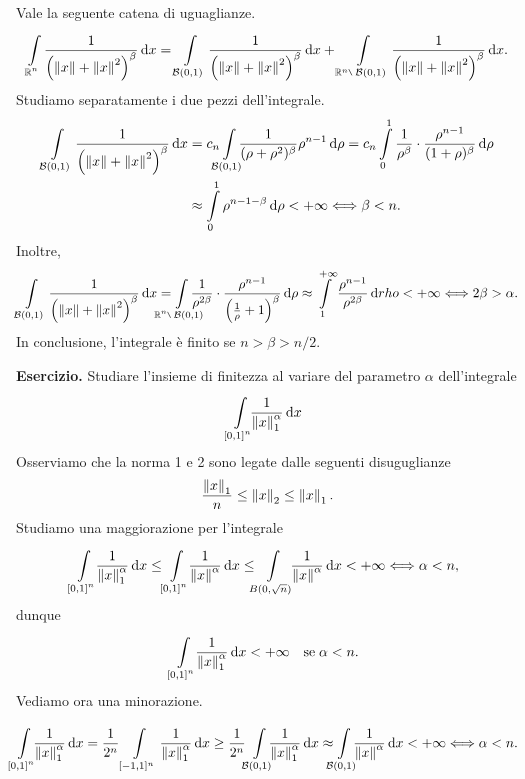 \documentclass[a4paper, 12pt]{report}
\begin{document}
Vale la seguente catena di uguaglianze.
%
$$
\int\limits_{\mathclap{\R^n}}^{} \frac{1}{\left( \norm{ x } + \norm{ x }^2 \right)^\beta} \dd x 
= \int\limits_{\mathcal{B}(0,1)}^{} \frac{1}{\left( \norm{ x } + \norm{ x }^2 \right)^\beta} \dd x 
+ \int\limits_{\R^n \setminus \; \mathcal{B}(0,1)}^{} \frac{1}{\left( \norm{ x } + \norm{ x }^2 \right)^\beta} \dd x.
$$
%
Studiamo separatamente i due pezzi dell'integrale.
%
\begin{align*}
	\int\limits_{\mathcal{B}(0,1)}^{} \frac{1}{\left( \norm{ x } + \norm{ x }^2 \right)^\beta} \dd x 
	& = c_n \int\limits_{\mathclap{\mathcal{B}(0,1)}}^{} \frac{1}{(\rho + \rho^2)^\beta} \rho^{n-1} \dd \rho
	= c_n \int\limits_{\mathclap{0}}^{1} \frac{1}{\rho^\beta} \cdot \frac{\rho^{n-1}}{(1 + \rho)^\beta} \dd \rho \\
	& \approx \int\limits_{\mathclap{0}}^{1} \rho^{n-1-\beta} \dd \rho < + \infty \longiff  \beta < n.
\end{align*}
%
Inoltre,
%
$$
	\int\limits_{\mathcal{B}(0,1)}^{} \frac{1}{\left( \norm{ x } + \norm{ x }^2 \right)^\beta} \dd x 
	= \int\limits_{\mathclap{\R^n \setminus \; \mathcal{B}(0,1)}}^{} \frac{1}{\rho^{2\beta}} \cdot \frac{\rho^{n-1}}{\left( \frac{1}{\rho} + 1 \right)^\beta} \dd \rho 
	\approx \int\limits_{\mathclap{1}}^{+\infty} \frac{\rho^{n-1}}{\rho^{2\beta}} \dd rho < + \infty \longiff 2\beta > \alpha.  
$$
%
In conclusione, l'integrale è finito se $n > \beta > n / 2$.


\textbf{Esercizio.}
Studiare l'insieme di finitezza al variare del parametro $\alpha$ dell'integrale
$$
	\int\limits_{\mathclap{[0,1]^n}}^{} \frac{1}{\norm{ x }_1^\alpha} \dd x 
$$
Osserviamo che la norma 1 e 2 sono legate dalle seguenti disuguglianze
$$
	\frac{\left\lVert  x  \right\rVert_1}{n} \leq \left\lVert  x  \right\rVert_2 \leq \left\lVert  x  \right\rVert_1.
$$
%
Studiamo una maggiorazione per l'integrale
%
$$
	\int\limits_{\mathclap{[0,1]^n}}^{} \, \frac{1}{\norm{ x }_1^\alpha} \dd x 
	\leq \;\int\limits_{\mathclap{[0,1]^n}}^{} \, \frac{1}{\norm{ x }^\alpha} \dd x 
	\leq \;\;\int\limits_{\mathclap{B(0,\sqrt{n})}}^{}\;\; \frac{1}{\norm{ x }^\alpha} \dd x < + \infty \longiff \alpha < n,
$$
%
dunque
%
$$
\int\limits_{\mathclap{[0,1]^n}}^{} \, \frac{1}{\norm{ x }_1^\alpha} \dd x < +\infty \quad \text{se} \; \alpha < n.
$$
%
Vediamo ora una minorazione.

$$
	\int\limits_{\mathclap{[0,1]^n}}^{} \frac{1}{\norm{ x }_1^\alpha} \dd x 
= \frac{1}{2^n}	\int\limits_{[-1,1]^n}^{} \frac{1}{\norm{ x }_1^\alpha} \dd x 
\geq \frac{1}{2^n} \ \int\limits_{\mathclap{\mathcal{B}(0,1)}}^{} \frac{1}{\norm{ x }_1^\alpha} \dd x 
\approx \int\limits_{\mathclap{\mathcal{B}(0,1)}}^{} \frac{1}{\norm{ x }^\alpha} \dd x < + \infty 
\longiff \alpha < n.
$$
\end{document}
